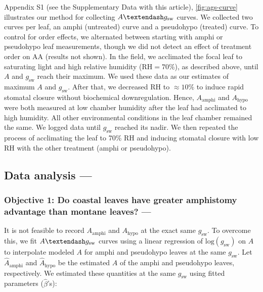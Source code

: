 \documentclass[
  letterpaper,
  DIV=11,
  numbers=noendperiod]{scrartcl}
\begin{document}
Appendix S1 (see the Supplementary Data with this article),
\autoref{fig:ags-curve} illustrates our method for collecting
\(A \textendash g_\text{sw}\) curves. We collected two curves per leaf,
an amphi (untreated) curve and a pseudohypo (treated) curve. To control
for order effects, we alternated between starting with amphi or
pseudohypo leaf measurements, though we did not detect an effect of
treatment order on \(\mathrm{AA}\) (results not shown). In the field, we
acclimated the focal leaf to saturating light and high relative humidity
(\(\mathrm{RH} = 70\%\)), as described above, until \(A\) and
\(g_\text{sw}\) reach their maximum. We used these data as our estimates
of maximum \(A\) and \(g_\text{sw}\). After that, we decreased
\(\mathrm{RH}\) to \(\approx 10\%\) to induce rapid stomatal closure
without biochemical downregulation. Hence, \(A_\text{amphi}\) and
\(A_\text{hypo}\) were both measured at low chamber humidity after the
leaf had acclimated to high humidity. All other environmental conditions
in the leaf chamber remained the same. We logged data until
\(g_\text{sw}\) reached its nadir. We then repeated the process of
acclimating the leaf to 70\% \(\mathrm{RH}\) and inducing stomatal
closure with low \(\mathrm{RH}\) with the other treatment (amphi or
pseudohypo).

\hypertarget{data-analyis}{%
\subsection{Data analysis ---}\label{data-analyis}}

\hypertarget{objective-1-do-coastal-leaves-have-greater-amphistomy-advantage-than-montane-leaves}{%
\subsubsection{Objective 1: Do coastal leaves have greater amphistomy
advantage than montane leaves?
---}\label{objective-1-do-coastal-leaves-have-greater-amphistomy-advantage-than-montane-leaves}}

It is not feasible to record \(A_\mathrm{amphi}\) and
\(A_\mathrm{hypo}\) at the exact same \(g_\text{sw}\). To overcome this,
we fit \(A \textendash g_\text{sw}\) curves using a linear regression of
\(\text{log}(g_\mathrm{sw})\) on \(A\) to interpolate modeled \(A\) for
amphi and pseudohypo leaves at the same \(g_\text{sw}\). Let
\(\hat{A}_\text{amphi}\) and \(\hat{A}_\text{hypo}\) be the estimated
\(A\) of the amphi and pseudohypo leaves, respectively. We estimated
these quantities at the same \(g_\mathrm{sw}\) using fitted parameters
(\(\hat{\beta}\)'s):
\end{document}
